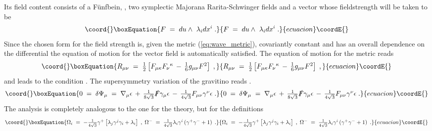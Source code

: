\documentclass[a4paper,12pt]{article}
\begin{document}
Its field content consists of a F\"unfbein, \coordHE{},
two symplectic Majorana Rarita-Schwinger fields \myHighlight{$\Psi_{\mu}$}\coordHE{}
and a vector \coordHE{} whose fieldstrength will be taken to be
\begin{equation}\coord{}\boxEquation{
 F \;=\; du\wedge\ \lambda_{i}dx^{i} \; .
}{
 F \;=\; du\wedge\ \lambda_{i}dx^{i} \; .
}{ecuacion}\coordE{}\end{equation}
Since the chosen form for the field strength is, given the metric (\ref{eq:wave_metric}),
covariantly constant and has an overall dependence on the differential \coordHE{} the equation
of motion for the vector field is automatically satisfied. The equation of motion for the
metric reads
\begin{equation}\coord{}\boxEquation{
 R_{\mu\nu} \;=\; \textstyle{\frac{1}{2}}\left[
                     F_{\mu\kappa}F_{\nu}{}^{\kappa}\,-\,
                     \textstyle{\frac{1}{6}}g_{\mu\nu}F^{2}
                  \right] \; ,
}{
 R_{\mu\nu} \;=\; \textstyle{\frac{1}{2}}\left[
                     F_{\mu\kappa}F_{\nu}{}^{\kappa}\,-\,
                     \textstyle{\frac{1}{6}}g_{\mu\nu}F^{2}
                  \right] \; ,
}{ecuacion}\coordE{}\end{equation}
and leads to the condition \coordHE{}. 
The supersymmetry variation of the gravitino reads \cite{art:cremmer}.
\begin{equation}\coord{}\boxEquation{
 0\;=\; \delta\Psi_{\mu}\;=\;
 \nabla_{\mu}\epsilon \,+\,
 \textstyle{\frac{1}{8\sqrt{3}}} \slashed{F}\gamma_{\mu}\epsilon \,-\,
 \textstyle{\frac{1}{4\sqrt{3}}} F_{\mu\nu}\gamma^{\nu}\epsilon \; .
}{
 0\;=\; \delta\Psi_{\mu}\;=\;
 \nabla_{\mu}\epsilon \,+\,
 \textstyle{\frac{1}{8\sqrt{3}}} \slashed{F}\gamma_{\mu}\epsilon \,-\,
 \textstyle{\frac{1}{4\sqrt{3}}} F_{\mu\nu}\gamma^{\nu}\epsilon \; .
}{ecuacion}\coordE{}\end{equation}
The analysis is completely analogous to the one for the \coordHE{} theory,
but for the definitions
\begin{equation}\coord{}\boxEquation{
\Omega_{i} \;=\; -\textstyle{\frac{1}{4\sqrt{3}}}\gamma^{+}
                 \left[
                     \lambda_{j}\gamma^{j}\gamma_{i}+\lambda_{i}
                 \right] \; ,\;
\Omega^{-} \;=\; \textstyle{\frac{1}{4\sqrt{3}}}\lambda_{i}\gamma^{i}
               \left(
                  \gamma^{+}\gamma^{-}+1
               \right) \; .
}{
\Omega_{i} \;=\; -\textstyle{\frac{1}{4\sqrt{3}}}\gamma^{+}
                 \left[
                     \lambda_{j}\gamma^{j}\gamma_{i}+\lambda_{i}
                 \right] \; ,\;
\Omega^{-} \;=\; \textstyle{\frac{1}{4\sqrt{3}}}\lambda_{i}\gamma^{i}
               \left(
                  \gamma^{+}\gamma^{-}+1
               \right) \; .
}{ecuacion}\coordE{}\end{equation}
\end{document}
